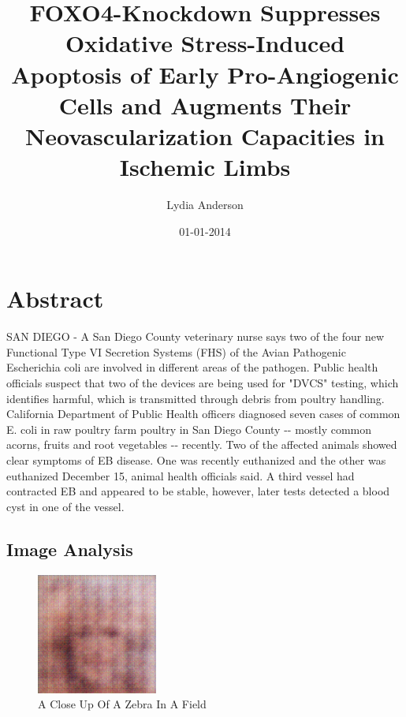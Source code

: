 \documentclass{article}%
\title{FOXO4{-}Knockdown Suppresses Oxidative Stress{-}Induced Apoptosis of Early Pro{-}Angiogenic Cells and Augments Their Neovascularization Capacities in Ischemic Limbs}%
\author{Lydia Anderson}%
\affil{Oncology Research, Pfizer Worldwide Research and Development, San Diego, California, United States of America}%
\date{01{-}01{-}2014}%
\begin{document}
%
\normalsize%
\maketitle%
\section{Abstract}%
\label{sec:Abstract}%
SAN DIEGO {-}\newline%
A San Diego County veterinary nurse says two of the four new Functional Type VI Secretion Systems (FHS) of the Avian Pathogenic Escherichia coli are involved in different areas of the pathogen.\newline%
Public health officials suspect that two of the devices are being used for "DVCS" testing, which identifies harmful, which is transmitted through debris from poultry handling.\newline%
California Department of Public Health officers diagnosed seven cases of common E. coli in raw poultry farm poultry in San Diego County {-}{-} mostly common acorns, fruits and root vegetables {-}{-} recently.\newline%
Two of the affected animals showed clear symptoms of EB disease. One was recently euthanized and the other was euthanized December 15, animal health officials said.\newline%
A third vessel had contracted EB and appeared to be stable, however, later tests detected a blood cyst in one of the vessel.

%
\subsection{Image Analysis}%
\label{subsec:ImageAnalysis}%


\begin{figure}[h!]%
\centering%
\includegraphics[width=150px]{500_fake_images/samples_5_362.png}%
\caption{A Close Up Of A Zebra In A Field}%
\end{figure}

%
\end{document}
